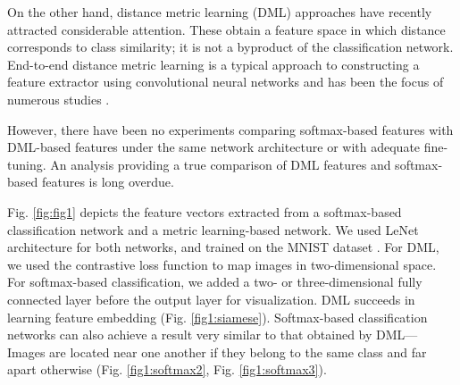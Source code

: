 \documentclass[9pt,technote,compsoc]{./sty/IEEEtran}
\begin{document}
\begin{figure*}[h!]
	\centering
	\hfill
	\hfill
	\hfill
	\hfill
	\caption{Depiction of MNIST dataset. (a) Two-dimensional features obtained by siamese network. (b) Two-dimensional features extracted from softmax-based classifier; these features are well separated by angle but not by Euclidean norm. (c) Three-dimensional features extracted from softmax-based classifier; we normalized these to have unit L2 norm and depict them in an azimuth--elevation coordinate system. The three-dimensional features are well separated by their classes.}
	\label{fig:fig1}
\end{figure*}


On the other hand, distance metric learning (DML) approaches have recently attracted considerable attention. 
These obtain a feature space in which distance corresponds to class similarity; it is not a byproduct of the classification network.
End-to-end distance metric learning is a typical approach to constructing a feature extractor using convolutional neural networks and has been the focus of numerous studies \cite{bell2015productnet,schroff2015facenet,song2016deep,sohn2016improved,song2017learnable}.

However, there have been no experiments comparing softmax-based features with DML-based features under the same network architecture or with adequate fine-tuning.
An analysis providing a true comparison of DML features and softmax-based features is long overdue.

Fig. \ref{fig:fig1} depicts the feature vectors extracted from a softmax-based classification network and a metric learning-based network.
We used LeNet architecture for both networks, and trained on the MNIST dataset \cite{lecun1998gradient}.
For DML, we used the contrastive loss function \cite{hadsell2006dimensionality} to map images in two-dimensional space.
For softmax-based classification, we added a two- or three-dimensional fully connected layer before the output layer for visualization.
DML succeeds in learning feature embedding (Fig. \ref{fig1:siamese}).
Softmax-based classification networks can also achieve a result very similar to that obtained by DML--- Images are located near one another if they belong to the same class and far apart otherwise (Fig. \ref{fig1:softmax2}, Fig. \ref{fig1:softmax3}).
\end{document}
